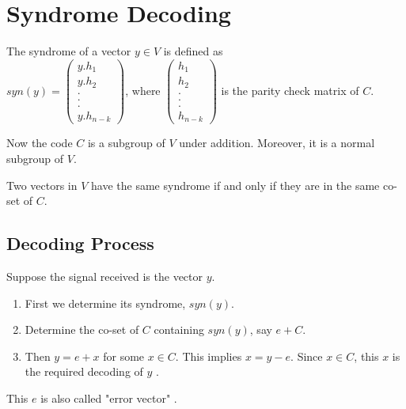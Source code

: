 \vspace{9mm}
\section{Syndrome Decoding}
\begin{definition} \cite{error_correct}
  The syndrome of a vector \(y \in V\) is defined as \\ \(syn(y)=\begin{pmatrix}
    y.h_1\\
    y.h_2\\
    .\\
    .\\
    .\\
    y.h_{n-k}
  \end{pmatrix}\), \hspace{12mm} where \(\begin{pmatrix}
    h_1 \\ h_2\\ .\\ .\\ .\\ h_{n-k}
  \end{pmatrix}\) is the parity check matrix of \(C\).
\end{definition}
\vspace{3mm}
Now the code \(C\) is a subgroup of \(V\) under addition. Moreover, it is a normal subgroup of \(V\).
\begin{theorem} \cite{error_correct}
  Two vectors in \(V\) have the same syndrome if and only if they are in the same co-set of \(C\).
\end{theorem}
\clearpage

\subsection{Decoding Process}
Suppose the signal received is the vector \(y\).
\begin{enumerate}
\item First we determine its syndrome, \(syn(y)\).
\item Determine the co-set of \(C\) containing \(syn(y)\), say \(e + C\).
\item Then \(y=e+x\) for some \(x \in C\). This implies \(x=y-e\). Since \(x \in C\), this \(x\) is the required decoding of \(y\) \cite{error_correct}.
\end{enumerate}
This \(e\) is also called "error vector" \cite{error_correct}.
\vspace{2mm}


